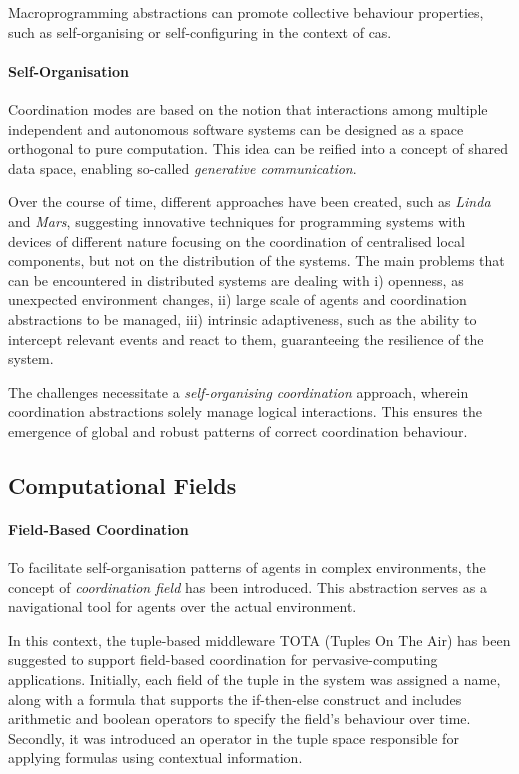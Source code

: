 Macroprogramming abstractions can promote collective behaviour properties, such as self-organising or self-configuring in
the context of \ac{cas}.

\paragraph{Self-Organisation}
Coordination modes are based on the notion that interactions among multiple independent and autonomous software systems
can be designed as a space orthogonal to pure computation.
This idea can be reified into a concept of shared data space, enabling so-called \emph{generative communication}.

Over the course of time, different approaches have been created, such as \emph{Linda} and \emph{Mars},
suggesting innovative techniques for programming systems with devices of different nature focusing on the coordination
of centralised local components, but not on the distribution of the systems.
The main problems that can be encountered in distributed systems are dealing with
    i) openness, as unexpected environment changes,
    ii) large scale of agents and coordination abstractions to be managed,
    iii) intrinsic adaptiveness, such as the ability to intercept relevant events and react to them, guaranteeing
        the resilience of the system.

The challenges necessitate a \emph{self-organising coordination} approach, wherein coordination abstractions solely
manage logical interactions.
This ensures the emergence of global and robust patterns of correct coordination behaviour.


\subsection{Computational Fields}
\label{subsec:computational-fields}

\paragraph{Field-Based Coordination}
To facilitate self-organisation patterns of agents in complex environments, the concept of \emph{coordination field}
has been introduced.
This abstraction serves as a navigational tool for agents over the actual environment.

In this context, the tuple-based middleware TOTA (Tuples On The Air) has been suggested to support field-based
coordination for pervasive-computing applications.
Initially, each field of the tuple in the system was assigned a name, along with a formula that supports the
if-then-else construct and includes arithmetic and boolean operators to specify the field's behaviour over time.
Secondly, it was introduced an operator in the tuple space responsible for applying formulas using contextual information.\\

